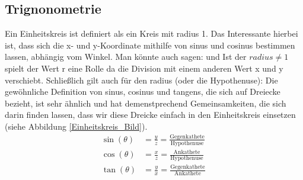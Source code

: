 \documentclass[letterpaper, titlepage]{article}
\begin{document}
\subsection{Trignonometrie}\label{Trignonometrie}
Ein Einheitskreis ist definiert als ein Kreis mit radius 1. Das Interessante hierbei ist, dass sich die x- und y-Koordinate mithilfe von sinus und cosinus bestimmen lassen, abhängig vom Winkel. Man könnte auch sagen: 
 und 
 Ist der $radius \neq 1$ spielt der Wert r eine Rolle da die Division mit einem anderen Wert x und y verschiebt. Schließlich gilt auch für den radius (oder die Hypothenuse):
Die gewöhnliche Definition von sinus, cosinus und tangens, die sich auf Dreiecke bezieht, ist sehr ähnlich und hat demenstprechend Gemeinsamkeiten, die sich darin finden lassen, dass wir diese Dreicke einfach in den Einheitskreis einsetzen (siehe Abbildung \ref{Einheitskreis_Bild}).
\skiptwolines
\begin{align*}
    \sin(\theta) &= \frac{y}{z} = \frac{\text{Gegenkathete}}{\text{Hypothenuse}} \
    \\
    \cos(\theta) &= \frac{x}{z} = \frac{\text{Ankathete}}{\text{Hypothenuse}} \
    \\
    \tan(\theta) &= \frac{y}{x} = \frac{\text{Gegenkathete}}{\text{Ankathete}}
    \label{Trignonometrische Formeln}
    \end{align*}
\end{document}

